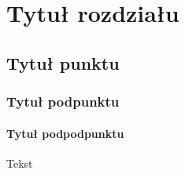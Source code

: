 ﻿%
\chapter{Tytuł rozdziału}


\section{Tytuł punktu}
\subsection{Tytuł podpunktu}
\subsubsection{Tytuł podpodpunktu}
Tekst

